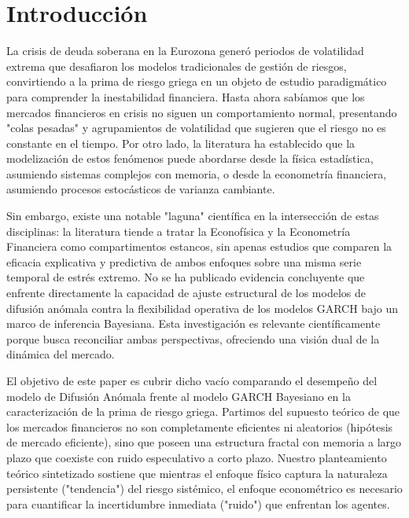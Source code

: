 \section{Introducción}
\label{sec:introduction}

La crisis de deuda soberana en la Eurozona generó periodos de volatilidad extrema que desafiaron los modelos tradicionales de gestión de riesgos, convirtiendo a la prima de riesgo griega en un objeto de estudio paradigmático para comprender la inestabilidad financiera. Hasta ahora sabíamos que los mercados financieros en crisis no siguen un comportamiento normal, presentando "colas pesadas" y agrupamientos de volatilidad que sugieren que el riesgo no es constante en el tiempo. Por otro lado, la literatura ha establecido que la modelización de estos fenómenos puede abordarse desde la física estadística, asumiendo sistemas complejos con memoria, o desde la econometría financiera, asumiendo procesos estocásticos de varianza cambiante.

Sin embargo, existe una notable "laguna" científica en la intersección de estas disciplinas: la literatura tiende a tratar la Econofísica y la Econometría Financiera como compartimentos estancos, sin apenas estudios que comparen la eficacia explicativa y predictiva de ambos enfoques sobre una misma serie temporal de estrés extremo. No se ha publicado evidencia concluyente que enfrente directamente la capacidad de ajuste estructural de los modelos de difusión anómala contra la flexibilidad operativa de los modelos GARCH bajo un marco de inferencia Bayesiana. Esta investigación es relevante científicamente porque busca reconciliar ambas perspectivas, ofreciendo una visión dual de la dinámica del mercado.

El objetivo de este paper es cubrir dicho vacío comparando el desempeño del modelo de Difusión Anómala frente al modelo GARCH Bayesiano en la caracterización de la prima de riesgo griega. Partimos del supuesto teórico de que los mercados financieros no son completamente eficientes ni aleatorios (hipótesis de mercado eficiente), sino que poseen una estructura fractal con memoria a largo plazo que coexiste con ruido especulativo a corto plazo. Nuestro planteamiento teórico sintetizado sostiene que mientras el enfoque físico captura la naturaleza persistente ("tendencia") del riesgo sistémico, el enfoque econométrico es necesario para cuantificar la incertidumbre inmediata ("ruido") que enfrentan los agentes.